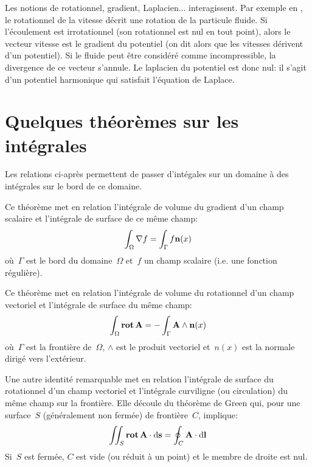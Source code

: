 \bigskip
Les notions de rotationnel, gradient, Laplacien... interagissent. Par exemple en
, le rotationnel de la vitesse décrit une rotation de la particule fluide.
Si l'écoulement est irrotationnel (son rotationnel est nul en tout point), alors le vecteur vitesse est le gradient du
potentiel (on dit alors que les vitesses dérivent d'un potentiel).
Si le fluide peut être considéré comme incompressible, la divergence de ce vecteur s'annule.
Le laplacien du potentiel est donc nul: il s'agit d'un potentiel harmonique qui satisfait l'équation de Laplace.

\medskip
\section{Quelques théorèmes sur les intégrales}

Les relations ci-après permettent de passer d'intégales sur un domaine à des
intégrales sur le bord de ce domaine.


\medskip
\begin{theoreme}

Ce théorème met en relation l'intégrale de volume du gradient d'un champ scalaire et l'intégrale
de surface de ce même champ:
 \begin{equation}
  \int_\Omega \nabla f = \int_\Gamma f \mathbf{n}(x)
\end{equation}
où~$\Gamma$ est le bord du domaine~$\Omega$ et~$f$ un champ scalaire (i.e. une fonction régulière).
\end{theoreme}

\medskip
\begin{theoreme}

Ce théorème met en relation l'intégrale de volume du rotationnel d'un champ vectoriel et l'intégrale
de surface du même champ:
\begin{equation}
\int_\Omega \operatorname{\mathbf{rot}} \mathbf{A} =
-\int_\Gamma \mathbf{A} \wedge \mathbf{n}(x)
\end{equation}
où~$\Gamma$ est la frontière de~$\Omega$, $\wedge$ est le produit vectoriel et~$n(x)$ est
la normale dirigé vers l'extérieur.
\end{theoreme}

\medskip{}
Une autre identité remarquable met en relation l'intégrale de surface du rotationnel d'un champ vectoriel
et l'intégrale curviligne (ou circulation) du même champ sur la frontière.
Elle découle du théorème de Green qui, pour une surface~$S$ (généralement non fermée) de
frontière~$C$, implique:
\begin{equation}
\iint_S \operatorname{\mathbf{rot}} \mathbf{A} \cdot \text{d}\mathbf{s} = \oint_C \mathbf{A} \cdot \text{d}\mathbf{l}
\end{equation}
Si~$S$ est fermée, $C$ est vide (ou réduit à un point) et le membre de droite est nul.

